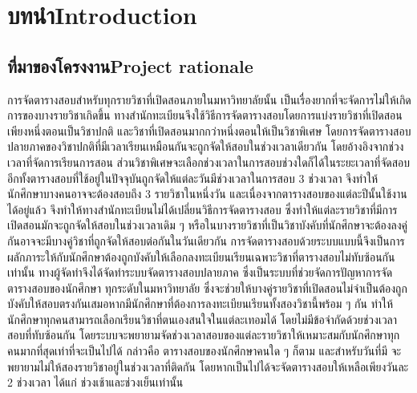 \chapter{\ifcpe บทนำ\else Introduction\fi}

\section{\ifcpe ที่มาของโครงงาน\else Project rationale\fi}


การจัดตารางสอบสำหรับทุกรายวิชาที่เปิดสอนภายในมหาวิทยาลัยนั้น
เป็นเรื่องยากที่จะจัดการไม่ให้เกิดการของบางรายวิชาเกิดขึ้น
ทางสำนักทะเบียนจึงใช้วิธีการจัดตารางสอบโดยการแบ่งรายวิชาที่เปิดสอนเพียงหนึ่งตอนเป็นวิชาปกติ
และวิชาที่เปิดสอนมากกว่าหนึ่งตอนให้เป็นวิชาพิเศษ
โดยการจัดตารางสอบปลายภาคของวิชาปกติที่มีเวลาเรียนเหมือนกันจะถูกจัดให้สอบในช่วงเวลาเดียวกัน
โดยอ้างอิงจากช่วงเวลาที่จัดการเรียนการสอน ส่วนวิชาพิเศษจะเลือกช่วงเวลาในการสอบช่วงใดก็ได้ในระยะเวลาที่จัดสอบ
อีกทั้งตารางสอบที่ใช้อยู่ในปัจจุบันถูกจัดให้แต่ละวันมีช่วงเวลาในการสอบ 3 ช่วงเวลา
จึงทำให้นักศึกษาบางคนอาจจะต้องสอบถึง 3 รายวิชาในหนึ่งวัน 
และเนื่องจากตารางสอบของแต่ละปีนั้นใช้งานได้อยู่แล้ว
จึงทำให้ทางสำนักทะเบียนไม่ได้เปลี่ยนวิธีการจัดตารางสอบ ซึ่งทำให้แต่ละรายวิชาที่มีการเปิดสอนมักจะถูกจัดให้สอบในช่วงเวลาเดิม ๆ
หรือในบางรายวิชาที่เป็นวิชาบังคับที่นักศึกษาจะต้องลงคู่กันอาจจะมีบางคู่วิชาที่ถูกจัดให้สอบต่อกันในวันเดียวกัน
การจัดตารางสอบด้วยระบบแบบนี้จึงเป็นการผลักภาระให้กับนักศึกษาต้องถูกบังคับให้เลือกลงทะเบียนเรียนเฉพาะวิชาที่ตารางสอบไม่ทับซ้อนกันเท่านั้น 
\enskip
ทางผู้จัดทำจึงได้จัดทำระบบจัดตารางสอบปลายภาค ซึ่งเป็นระบบที่ช่วยจัดการปัญหาการจัดตารางสอบของนักศึกษา
ทุกระดับในมหาวิทยาลัย ซึ่งจะช่วยให้บางคู่รายวิชาที่เปิดสอนไม่จำเป็นต้องถูกบังคับให้สอบตรงกันเสมอหากมีนักศึกษาที่ต้องการลงทะเบียนเรียนทั้งสองวิชานี้พร้อม ๆ กัน
ทำให้นักศึกษาทุกคนสามารถเลือกเรียนวิชาที่ตนเองสนใจในแต่ละเทอมได้ โดยไม่มีข้อจำกัดด้วยช่วงเวลาสอบที่ทับซ้อนกัน
โดยระบบจะพยายามจัดช่วงเวลาสอบของแต่ละรายวิชาให้เหมาะสมกับนักศึกษาทุกคนมากที่สุดเท่าที่จะเป็นไปได้ กล่าวคือ ตารางสอบของนักศึกษาคนใด ๆ ก็ตาม 
 และสำหรับวันที่มี จะพยายามไม่ให้สองรายวิชาอยู่ในช่วงเวลาที่ติดกัน
โดยหากเป็นไปได้จะจัดตารางสอบให้เหลือเพียงวันละ 2 ช่วงเวลา ได้แก่ ช่วงเช้าและช่วงเย็นเท่านั้น

